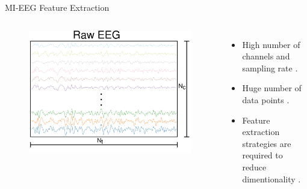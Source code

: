 \documentclass[aspectratio=169]{beamer}
\let\oldcite\cite %
\renewcommand{\cite}[1]{{\tiny\oldcite{#1}}}
\begin{document}
\begin{frame}{MI-EEG Feature Extraction}
    \begin{columns}
            \begin{figure}[!ht]
                \centering
                \includegraphics[width=0.7\linewidth,trim={0 0 0 10},clip]{figures/RAW_EEG.png}
            \end{figure}
            \begin{itemize}
                \item High number of channels and sampling rate \cite{chevallier2024largest}.
                \item Huge number of data points \cite{singh2021comprehensive}.
                \item Feature extraction strategies are required to reduce dimentionality \cite{ai2019feature}.
            \end{itemize}
    \end{columns}
    \centering
    
\end{frame}
\end{document}
